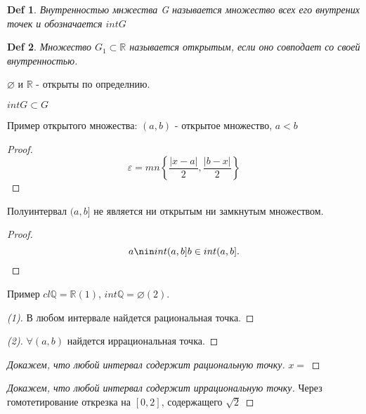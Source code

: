 \documentclass[a6paper, 10pt]{article}
\theoremstyle{plain}
\newtheorem{definition}{Def}
\newcommand{\Q}{\mathbb Q}
\newcommand{\R}{\mathbb R}
\newcommand{\eps}{\varepsilon}
\begin{document}
    \begin{definition}
        Внутренностью мнжества G называется множество всех его внутрених точек и обозначается
        $ int G $
    \end{definition}

    \begin{definition}
        Множество $ G_1 \subset \R $ называется открытым, если оно совподает со
        своей внутренностью.
    \end{definition}

    $ \varnothing $ и $ \R $ - открыты по определнию.

    $ int G \subset G $

    Пример открытого множества:
    $ \left( a, b \right) $ - открытое множество, $ a < b $

    \begin{proof}
        \[
        \eps = mn \left\{ \frac{\left| x - a \right| }{2}, \frac{\left| b - x \right| }{2} \right\}
        \]
    \end{proof}

    Полуинтервал $ (a, b] $ не является ни открытым ни замкнутым множеством.

    \begin{proof}
        \[
            a \nin int (a, b] \\
            b \in int (a, b]
        .\]
    \end{proof}

    Пример
    $ cl \Q = \R(1) $,
    $ int \Q = \varnothing(2) $.

    \begin{proof}[(1)]
        В любом интервале найдется рациональная точка.
    \end{proof}

    \begin{proof}[(2)]
        $ \forall (a, b) $ найдется иррациональная точка.
    \end{proof}

    \begin{proof}[Докажем, что любой интервал содержит рациональную точку]
        $ x =  $
    \end{proof}

    \begin{proof}[Докажем, что любой интервал содержит иррациональную точку]
        Через гомотетирование открезка на $ \left[ 0, 2 \right] $, содержащего
        $ \sqrt{2} $
    \end{proof}
\end{document}
